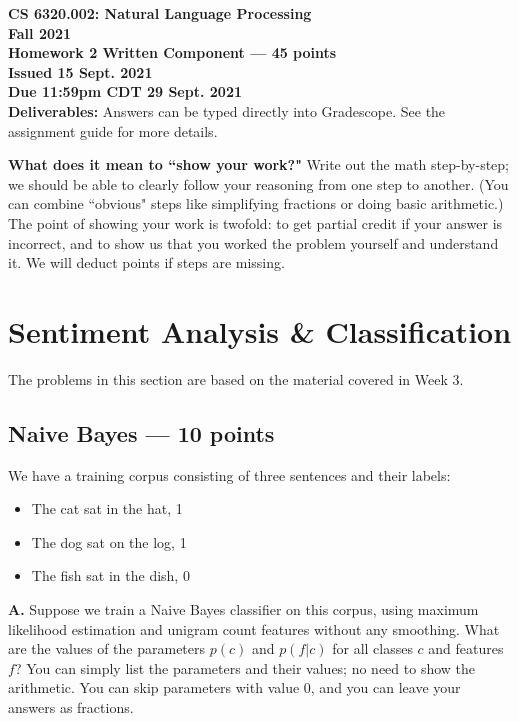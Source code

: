\documentclass[12pt,a4paper]{article}
\begin{document}
\pagestyle{empty}

\textbf{CS 6320.002: Natural Language Processing} \\
\textbf{Fall 2021} \\

\textbf{Homework 2 Written Component --- 45 points} \\
\textbf{Issued 15 Sept. 2021} \\
\textbf{Due 11:59pm CDT 29 Sept. 2021} \\

\textbf{Deliverables:} Answers can be typed directly into Gradescope. See the assignment guide for more details.

\vspace{\baselineskip}

\textbf{What does it mean to ``show your work?"} Write out the math step-by-step; we should be able to clearly follow your reasoning from one step to another. (You can combine ``obvious" steps like simplifying fractions or doing basic arithmetic.) The point of showing your work is twofold: to get partial credit if your answer is incorrect, and to show us that you worked the problem yourself and understand it. We will deduct points if steps are missing.

\section{Sentiment Analysis \& Classification}

The problems in this section are based on the material covered in Week 3.

\subsection{Naive Bayes --- 10 points}

We have a training corpus consisting of three sentences and their labels:
\begin{itemize}
\item The cat sat in the hat, 1
\item The dog sat on the log, 1
\item The fish sat in the dish, 0
\end{itemize}

\vspace{\baselineskip}

\textbf{A.} Suppose we train a Naive Bayes classifier on this corpus, using maximum likelihood estimation and unigram count features without any smoothing. What are the values of the parameters $p(c)$ and $p(f|c)$ for all classes $c$ and features $f$? You can simply list the parameters and their values; no need to show the arithmetic. You can skip parameters with value 0, and you can leave your answers as fractions. 
\end{document}
